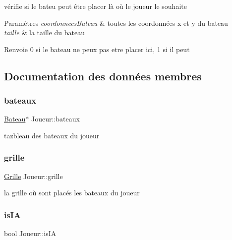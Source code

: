 vérifie si le bateu peut être placer là où le joueur le souhaite 


\begin{DoxyParams}{Paramètres}
{\em coordonnees\+Bateau} & toutes les coordonnées x et y du bateau \\
\hline
{\em taille} & la taille du bateau \\
\hline
\end{DoxyParams}
\begin{DoxyReturn}{Renvoie}
0 si le bateau ne peux pas etre placer ici, 1 si il peut 
\end{DoxyReturn}


\subsection{Documentation des données membres}
\mbox{\label{class_joueur_acf537ce482b493555318da7da14d8ac9}} 
\subsubsection{\texorpdfstring{bateaux}{bateaux}}
{\footnotesize\ttfamily \mbox{\hyperlink{class_bateau}{Bateau}}$\ast$ Joueur\+::bateaux\hspace{0.3cm}{\ttfamily [private]}}

tazbleau des bateaux du joueur \mbox{\label{class_joueur_a97a052f0b9966c94c49862df3144a62f}} 
\subsubsection{\texorpdfstring{grille}{grille}}
{\footnotesize\ttfamily \mbox{\hyperlink{class_grille}{Grille}} Joueur\+::grille\hspace{0.3cm}{\ttfamily [private]}}

la grille où sont placés les bateaux du joueur \mbox{\label{class_joueur_ac9305d8a63a4a02417bf2f64a357ee8d}} 
\subsubsection{\texorpdfstring{is\+IA}{isIA}}
{\footnotesize\ttfamily bool Joueur\+::is\+IA\hspace{0.3cm}{\ttfamily [private]}}

